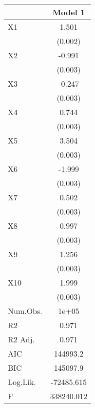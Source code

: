\documentclass[12pt]{article}
\begin{document}
\begin{enumerate}
\begin{table}[H]
\centering
\begin{tabular}[t]{|l|c|}
\toprule
  \hline & Model 1\\ \hline
\midrule
X1 & 1.501\\
 & (0.002)\\
X2 & -0.991\\
 & \vphantom{8} (0.003)\\
X3 & -0.247\\
 & \vphantom{7} (0.003)\\
X4 & 0.744\\
 & \vphantom{6} (0.003)\\
X5 & 3.504\\
 & \vphantom{5} (0.003)\\
X6 & -1.999\\
 & \vphantom{4} (0.003)\\
X7 & 0.502\\
 & \vphantom{3} (0.003)\\
X8 & 0.997\\
 & \vphantom{2} (0.003)\\
X9 & 1.256\\
 & \vphantom{1} (0.003)\\
X10 & 1.999\\
 & (0.003)\\
\midrule
Num.Obs. & 1e+05\\
R2 & 0.971\\
R2 Adj. & 0.971\\
AIC & 144993.2\\
BIC & 145097.9\\
Log.Lik. & -72485.615\\
F & 338240.012\\ \hline
\bottomrule
\end{tabular}
\end{table}



\end{enumerate}
\end{document}
